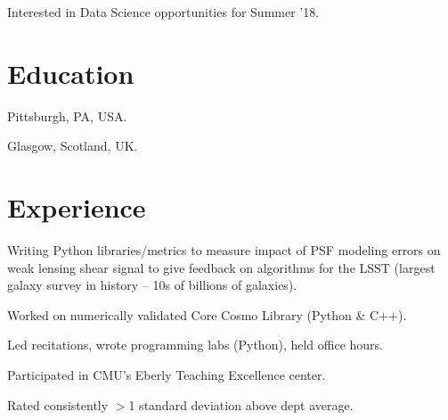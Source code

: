 \documentclass[]{deedy-resume-openfont}
\begin{document}
\hfill
\begin{minipage}[t]{0.66\textwidth} 


Interested in Data Science opportunities for Summer '18.

\section{\color{Blue} Education} 

 \hfill {}
Pittsburgh, PA, USA.
\sectionsep

 \hfill {}
Glasgow, Scotland, UK. $\;\;$  
\sectionsep


\section{\color{Blue} Experience}

 \hfill {}
\begin{tightemize} \item Writing Python libraries/metrics to measure impact of PSF modeling errors on weak lensing shear signal to give feedback on algorithms for the LSST (largest galaxy survey in history -- 10s of billions of galaxies). \item Worked on numerically validated Core Cosmo Library (Python \& C++).
\end{tightemize}
\begin{tightemize}\item Led recitations, wrote programming labs (Python), held office hours.
\item Participated in CMU's Eberly Teaching Excellence center. \item Rated consistently $>$1 standard deviation above dept average.
\end{tightemize}
\sectionsep


\end{minipage}
\end{document}
